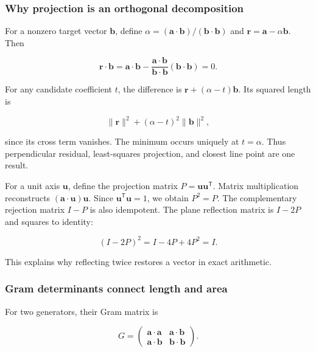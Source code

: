 \subsubsection{Why projection is an orthogonal decomposition}\label{02-foundations-ii-ch039-why-projection-is-an-orthogonal-decomposition}

\hypertarget{02-foundations-ii-ch039-why-projection-is-an-orthogonal-decomposition}{}

For a nonzero target vector \(\mathbf b\), define \(\alpha=(\mathbf a\cdot\mathbf b)/(\mathbf b\cdot\mathbf b)\) and \(\mathbf r=\mathbf a-\alpha\mathbf b\). Then

\[
\mathbf r\cdot\mathbf b=\mathbf a\cdot\mathbf b-
\frac{\mathbf a\cdot\mathbf b}{\mathbf b\cdot\mathbf b}(\mathbf b\cdot\mathbf b)=0.
\]

For any candidate coefficient \(t\), the difference is \(\mathbf r+(\alpha-t)\mathbf b\). Its squared length is

\[
\|\mathbf r\|^2+(\alpha-t)^2\|\mathbf b\|^2,
\]

since its cross term vanishes. The minimum occurs uniquely at \(t=\alpha\). Thus perpendicular residual, least-squares projection, and closest line point are one result.

For a unit axis \(\mathbf u\), define the projection matrix \(P=\mathbf u\mathbf u^\mathsf T\). Matrix multiplication reconstructs \((\mathbf a\cdot\mathbf u)\mathbf u\). Since \(\mathbf u^\mathsf T\mathbf u=1\), we obtain \(P^2=P\). The complementary rejection matrix \(I-P\) is also idempotent. The plane reflection matrix is \(I-2P\) and squares to identity:

\[
(I-2P)^2=I-4P+4P^2=I.
\]

This explains why reflecting twice restores a vector in exact arithmetic.

\subsubsection{Gram determinants connect length and area}\label{02-foundations-ii-ch039-gram-determinants-connect-length-and-area}

\hypertarget{02-foundations-ii-ch039-gram-determinants-connect-length-and-area}{}

For two generators, their Gram matrix is

\[
G=\begin{pmatrix}\mathbf a\cdot\mathbf a&\mathbf a\cdot\mathbf b\\
\mathbf a\cdot\mathbf b&\mathbf b\cdot\mathbf b\end{pmatrix}.
\]

